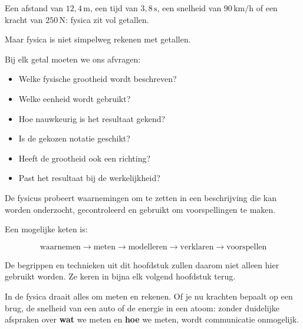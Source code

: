 \documentclass{ximera}
\begin{document}


Een afstand van $12{,}4\,\mathrm m$, een tijd van $3{,}8\,\mathrm s$,
een snelheid van $90\,\mathrm{km/h}$ of een kracht van
$250\,\mathrm N$: fysica zit vol getallen.

Maar fysica is niet simpelweg rekenen met getallen.

Bij elk getal moeten we ons afvragen:

\begin{itemize}
  \item Welke fysische grootheid wordt beschreven?
  \item Welke eenheid wordt gebruikt?
  \item Hoe nauwkeurig is het resultaat gekend?
  \item Is de gekozen notatie geschikt?
  \item Heeft de grootheid ook een richting?
  \item Past het resultaat bij de werkelijkheid?
\end{itemize}

De fysicus probeert waarnemingen om te zetten in een beschrijving die
kan worden onderzocht, gecontroleerd en gebruikt om voorspellingen te
maken.

Een mogelijke keten is:

\[
\boxed{
\text{waarnemen}
\longrightarrow
\text{meten}
\longrightarrow
\text{modelleren}
\longrightarrow
\text{verklaren}
\longrightarrow
\text{voorspellen}
}
\]

De begrippen en technieken uit dit hoofdstuk zullen daarom niet alleen
hier gebruikt worden. Ze keren in bijna elk volgend hoofdstuk terug.




    
    In de fysica draait alles om meten en rekenen. Of je nu krachten bepaalt op een brug, de snelheid van een auto of de energie in een atoom: zonder duidelijke afspraken over \textbf{wat} we meten en \textbf{hoe} we meten, wordt communicatie onmogelijk.
    
\end{document}
